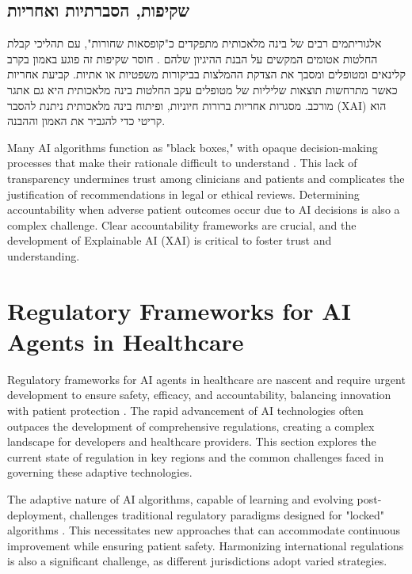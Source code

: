 \documentclass[12pt,a4paper]{article}
\newenvironment{hebrewblock}{%
  \begin{tcolorbox}[enhanced,breakable,
    title={\hebrewfont עברית},
    colback=blue!3!white,colframe=blue!35!white,
    fonttitle=\bfseries,
    attach boxed title to top right={yshift=-2.5mm,xshift=-4mm},
    boxed title style={colback=blue!35!white,sharp corners}]
  \begin{hebrew}
}{%
  \end{hebrew}
  \end{tcolorbox}\medskip
}
\newenvironment{englishblock}{%
  \begin{tcolorbox}[enhanced,breakable,
    title={English Translation},
    colback=gray!4!white,colframe=gray!40!white,
    fonttitle=\bfseries]
}{%
  \end{tcolorbox}\medskip
}
\begin{document}
\subsection{\texthebrew{שקיפות, הסברתיות ואחריות}}
\label{subsec:transparency-accountability-hebrew}
\begin{hebrewblock}
אלגוריתמים רבים של בינה מלאכותית מתפקדים כ"קופסאות שחורות", עם תהליכי קבלת החלטות אטומים המקשים על הבנת ההיגיון שלהם \cite{nih_ethical_implications}. חוסר שקיפות זה פוגע באמון בקרב קלינאים ומטופלים ומסבך את הצדקת ההמלצות בביקורות משפטיות או אתיות. קביעת אחריות כאשר מתרחשות תוצאות שליליות של מטופלים עקב החלטות בינה מלאכותית היא גם אתגר מורכב. מסגרות אחריות ברורות חיוניות, ופיתוח בינה מלאכותית ניתנת להסבר (XAI) הוא קריטי כדי להגביר את האמון וההבנה.
\end{hebrewblock}
\begin{englishblock}
Many AI algorithms function as "black boxes," with opaque decision-making processes that make their rationale difficult to understand \cite{nih_ethical_implications}. This lack of transparency undermines trust among clinicians and patients and complicates the justification of recommendations in legal or ethical reviews. Determining accountability when adverse patient outcomes occur due to AI decisions is also a complex challenge. Clear accountability frameworks are crucial, and the development of Explainable AI (XAI) is critical to foster trust and understanding.
\end{englishblock}

\section{Regulatory Frameworks for AI Agents in Healthcare}
\label{sec:regulatory-frameworks}
Regulatory frameworks for AI agents in healthcare are nascent and require urgent development to ensure safety, efficacy, and accountability, balancing innovation with patient protection \cite{fda_ai_ml_samd}. The rapid advancement of AI technologies often outpaces the development of comprehensive regulations, creating a complex landscape for developers and healthcare providers. This section explores the current state of regulation in key regions and the common challenges faced in governing these adaptive technologies.

The adaptive nature of AI algorithms, capable of learning and evolving post-deployment, challenges traditional regulatory paradigms designed for "locked" algorithms \cite{ey_global_regulatory}. This necessitates new approaches that can accommodate continuous improvement while ensuring patient safety. Harmonizing international regulations is also a significant challenge, as different jurisdictions adopt varied strategies.
\end{document}
